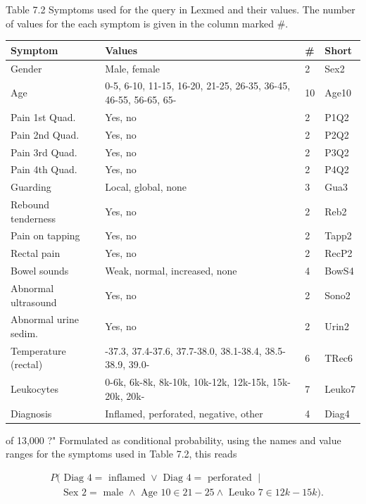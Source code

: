 \documentclass[10pt]{book}
\begin{document}
Table 7.2 Symptoms used for the query in Lexmed and their values. The number of values for the each symptom is given in the column marked \#.
\begin{center}
\begin{tabular}{|l|l|l|l|}
\hline
Symptom & Values & \# & Short \\
\hline
Gender & Male, female & 2 & Sex2 \\
\hline
Age & 0-5, 6-10, 11-15, 16-20, 21-25, 26-35, 36-45, 46-55, 56-65, 65- & 10 & Age10 \\
\hline
Pain 1st Quad. & Yes, no & 2 & P1Q2 \\
\hline
Pain 2nd Quad. & Yes, no & 2 & P2Q2 \\
\hline
Pain 3rd Quad. & Yes, no & 2 & P3Q2 \\
\hline
Pain 4th Quad. & Yes, no & 2 & P4Q2 \\
\hline
Guarding & Local, global, none & 3 & Gua3 \\
\hline
Rebound tenderness & Yes, no & 2 & Reb2 \\
\hline
Pain on tapping & Yes, no & 2 & Tapp2 \\
\hline
Rectal pain & Yes, no & 2 & RecP2 \\
\hline
Bowel sounds & Weak, normal, increased, none & 4 & BowS4 \\
\hline
Abnormal ultrasound & Yes, no & 2 & Sono2 \\
\hline
Abnormal urine sedim. & Yes, no & 2 & Urin2 \\
\hline
Temperature (rectal) & -37.3, 37.4-37.6, 37.7-38.0, 38.1-38.4, 38.5-38.9, 39.0- & 6 & TRec6 \\
\hline
Leukocytes & 0-6k, 6k-8k, 8k-10k, 10k-12k, 12k-15k, 15k-20k, 20k- & 7 & Leuko7 \\
\hline
Diagnosis & Inflamed, perforated, negative, other & 4 & Diag4 \\
\hline
\end{tabular}
\end{center}

of 13,000 ?" Formulated as conditional probability, using the names and value ranges for the symptoms used in Table 7.2, this reads

$$
\begin{aligned}
& P(\text { Diag } 4=\text { inflamed } \vee \text { Diag } 4=\text { perforated } \mid \\
& \quad \text { Sex } 2=\text { male } \wedge \text { Age } 10 \in 21-25 \wedge \text { Leuko } 7 \in 12 k-15 k) .
\end{aligned}
$$
\end{document}
